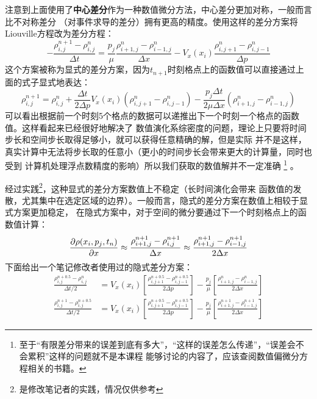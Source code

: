     注意到上面使用了\textbf{中心差分}作为一种数值微分方法，中心差分更加对称，一般而言比不对称差分
    （对事件求导的差分）拥有更高的精度。使用这样的差分方案将Liouville方程改为差分方程：
    \begin{equation}
        -\frac{\rho_{i, j}^{n+1} - \rho_{i, j}^{n}}{\Delta t} = \frac{p_j}{\mu}
        \frac{\rho_{i+1, j}^{n} - \rho_{i-1, j}^{n}}{\Delta x} - V_x(x_i)
        \frac{\rho_{i, j+1}^{n} - \rho_{i, j-1}^{n}}{\Delta p}
    \end{equation}
    这个方案被称为显式的差分方案，因为$t_{n+1}$时刻格点上的函数值可以直接通过上面的式子显式地表达：
    \begin{equation}
        \rho_{i, j}^{n+1} = \rho_{i, j}^{n} + \frac{\Delta t}{2\Delta p}V_{x}(x_i)(\rho_{i, j+1}^{n} - \rho_{i, j-1}^{n})
        - \frac{p_j\Delta t}{2 \mu \Delta x}(\rho_{i+1, j}^{n} - \rho_{i-1, j}^{n}) 
    \end{equation}
    可以看出根据前一个时刻5个格点的数据可以递推出下一个时刻一个格点的函数值。这样看起来已经很好地解决了
    数值演化系综密度的问题，理论上只要将时间步长和空间步长取得足够小，就可以获得任意精确的解，但是实际
    并不是这样，真实计算中无法将步长取的任意小（更小的时间步长会带来更大的计算量，同时也受到
    计算机处理浮点数精度的影响）所以我们获取的数值解并不一定准确
    \footnote{
        至于“有限差分带来的误差到底有多大”，“这样的误差怎么传递”，“误差会不会累积”这样的问题就不是本课程
        能够讨论的内容了，应该查阅数值偏微分方程相关的书籍。
    }
    。
    \par 
    经过实践\footnote{是修改笔记者的实践，情况仅供参考}，这种显式的差分方案数值上不稳定（长时间演化会带来
    函数值的发散，尤其集中在选定区域的边界）。一般而言，隐式的差分方案在数值上相较于显式方案更加稳定，
    在隐式方案中，对于空间的微分要通过下一个时刻格点上的函数值计算：
    \begin{equation}
        \frac{\partial{\rho(x_i, p_j, t_n)}}{\partial{x}} \approx \frac{\rho_{i + 1, j}^{n+1} - \rho_{i, j}^{n+1}}{\Delta x}
             \approx \frac{\rho_{i + 1, j}^{n+1} - \rho_{i-1, j}^{n+1}}{2\Delta x}
    \end{equation}
    下面给出一个笔记修改者使用过的隐式差分方案：
    \begin{equation}
        \begin{split}
            \frac{\rho_{i,j}^{n+0.5} - \rho_{i,j}^{n}}{\Delta t/2} &= V_{x}(x_{i})\left[\frac{\rho_{i,j+1}^{n+0.5} - 
            \rho_{i,j-1}^{n+0.5}}{2\Delta p}\right] - \frac{p_{j}}{\mu}\left[\frac{\rho_{i+1,j}^{n} - 
            \rho_{i-1,j}^{n}}{2\Delta x}\right]\\
            \frac{\rho_{i,j}^{n+1} - \rho_{i,j}^{n+0.5}}{\Delta t/2} &= V_{x}(x_{i})\left[\frac{\rho_{i,j+1}^{n+0.5} -
            \rho_{i,j-1}^{n+0.5}}{2\Delta p}\right] - \frac{p_{j}}{\mu}\left[\frac{\rho_{i+1,j}^{n+1} - 
            \rho_{i-1,j}^{n+1}}{2\Delta x}\right]
        \end{split}
    \end{equation}
